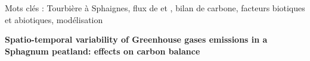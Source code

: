 {\begin{framed}
\begin{minipage}{\dimexpr\textwidth-2\fboxrule-2\fboxsep}
Mots cl\'es : Tourbière à Sphaignes, flux de \coo et \chh, bilan de carbone, facteurs biotiques et abiotiques, modélisation
	\end{minipage}
\end{framed}

\vfill

\begin{center}
	\large \textbf{Spatio-temporal variability of Greenhouse gases emissions in a Sphagnum peatland: effects on carbon balance}
\end{center}

}
